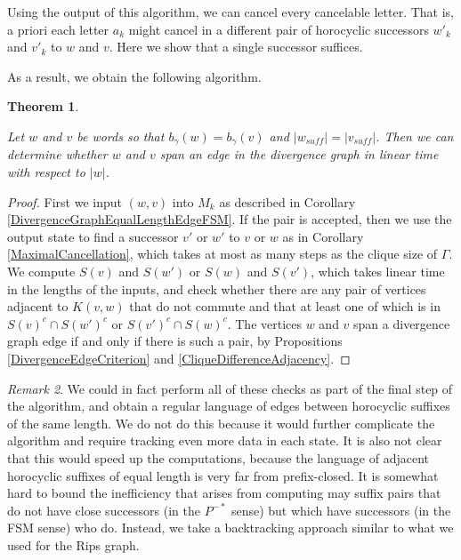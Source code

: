 \documentclass[10pt,a4paper]{amsart}
\newtheorem{theorem}{Theorem}[subsection]
\theoremstyle{definition}
\theoremstyle{remark}
\newtheorem{remark}[theorem]{Remark}
\begin{document}
	Using the output of this algorithm, we can cancel every cancelable letter. That is, a priori each letter $a_k$ might cancel in a different pair of horocyclic successors $w'_k$ and $v'_k$ to $w$ and $v$. Here we show that a single successor suffices.
	
	As a result, we obtain the following algorithm.
	
	\begin{theorem}\label{DivergenceEdgeSameLengthEdgeChecker}
		
		Let $w$ and $v$ be words so that $b_{\gamma}(w)=b_{\gamma}(v)$ and $|w_{suff}|=|v_{suff}|$. Then we can determine whether $w$ and $v$ span an edge in the divergence graph in linear time with respect to $|w|$.
		
	\end{theorem} 
	
	\begin{proof}
		
            First we input $(w,v)$ into $M_k$ as described in Corollary \ref{DivergenceGraphEqualLengthEdgeFSM}. If the pair is accepted, then we use the output state to find a successor $v'$ or $w'$ to $v$ or $w$ as in Corollary \ref{MaximalCancellation}, which takes at most as many steps as the clique size of $\Gamma$. We compute $S(v)$ and $S(w')$ or $S(w)$ and $S(v')$, which takes linear time in the lengths of the inputs, and check whether there are any pair of vertices adjacent to $K(v,w)$ that do not commute and that at least one of which is in $S(v)^c\cap S(w')^c$ or $S(v')^c\cap S(w)^c$. The vertices $w$ and $v$ span a divergence graph edge if and only if there is such a pair, by Propositions \ref{DivergenceEdgeCriterion} and \ref{CliqueDifferenceAdjacency}.
	\end{proof}
	
	\begin{remark}
		
		We could in fact perform all of these checks as part of the final step of the algorithm, and obtain a regular language of edges between horocyclic suffixes of the same length. We do not do this because it would further complicate the algorithm and require tracking even more data in each state. It is also not clear that this would speed up the computations, because the language of adjacent horocyclic suffixes of equal length is very far from prefix-closed. It is somewhat hard to bound the inefficiency that arises from computing may suffix pairs that do not have close successors (in the $P^{-*}$ sense) but which have successors (in the FSM sense) who do. Instead, we take a backtracking approach similar to what we used for the Rips graph.
	\end{remark}
	
\end{document}
